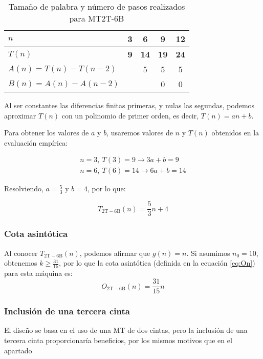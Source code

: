 \begin{table}[H]
    \centering
    \begin{tabular}{|l|c|c|c|c|}
        \hline
        $n$    & \textbf{3} & \textbf{6}  & \textbf{9}  & \textbf{12} \\ \hline
        $T(n)$ & \textbf{9} & \textbf{14} & \textbf{19} & \textbf{24} \\ \hline
        \hline
        $A(n) = T(n) - T(n-2)$ &   & 5 & 5 & 5 \\ \hline
        $B(n) = A(n) - A(n-2)$ &   &   & 0 & 0 \\ \hline
    \end{tabular}
    \caption{Tamaño de palabra y número de pasos realizados para MT2T-6B}
\end{table}

Al ser constantes las diferencias finitas primeras, y nulas las segundas, podemos aproximar $T(n)$ con un polinomio de primer orden, es decir, $T(n) = an + b$.\medskip

Para obtener los valores de $a$ y $b$, usaremos valores de $n$ y $T(n)$ obtenidos en la evaluación empírica:

\begin{subequations}
    \begin{gather*}
        n = 3,\ T(3) = 9 \rightarrow 3a + b = 9 \\
        n = 6,\ T(6) = 14 \rightarrow 6a + b = 14
    \end{gather*}
\end{subequations}

Resolviendo, $a=\frac{5}{3}$ y $b=4$, por lo que:

\begin{equation}
    T_{\mathrm{2T-6B}}(n) = \frac{5}{3}n + 4
\end{equation}


\subsubsection*{Cota asintótica}
Al conocer $T_{\mathrm{2T-6B}}(n)$, podemos afirmar que $g(n) = n$. Si asumimos $n_0 = 10$, obtenemos $k \geq \frac{31}{15}$, por lo que la cota asintótica (definida en la ecuación \ref{eq:On}) para esta máquina es:
\begin{equation}
    O_{\mathrm{2T-6B}}(n) = \frac{31}{15} n
\end{equation}



\subsubsection*{Inclusión de una tercera cinta}
El diseño se basa en el uso de una MT de dos cintas, pero la inclusión de una tercera cinta proporcionaría beneficios, por los mismos motivos que en el apartado 

